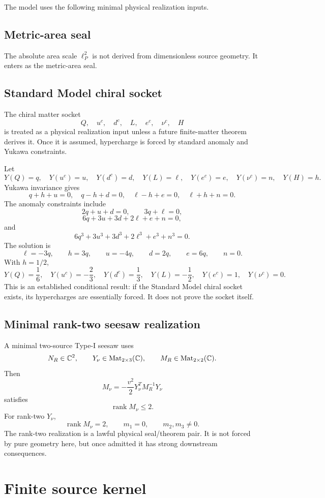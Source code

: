 \documentclass[11pt]{article}
\newcommand{\rank}{\operatorname{rank}}
\begin{document}
The model uses the following minimal physical realization inputs.

\subsection{Metric-area seal}

The absolute area scale \(\ell_P^2\) is not derived from dimensionless source geometry. It enters as the metric-area seal.

\subsection{Standard Model chiral socket}

The chiral matter socket
\[
Q,\quad u^c,\quad d^c,\quad L,\quad e^c,\quad \nu^c,\quad H
\]
is treated as a physical realization input unless a future finite-matter theorem derives it. Once it is assumed, hypercharge is forced by standard anomaly and Yukawa constraints.

Let
\[
Y(Q)=q,\quad Y(u^c)=u,\quad Y(d^c)=d,\quad
Y(L)=\ell,\quad Y(e^c)=e,\quad Y(\nu^c)=n,\quad Y(H)=h.
\]
Yukawa invariance gives
\[
q+h+u=0,\quad q-h+d=0,\quad \ell-h+e=0,\quad \ell+h+n=0.
\]
The anomaly constraints include
\[
2q+u+d=0,\qquad 3q+\ell=0,
\]
\[
6q+3u+3d+2\ell+e+n=0,
\]
and
\[
6q^3+3u^3+3d^3+2\ell^3+e^3+n^3=0.
\]
The solution is
\[
\ell=-3q,\qquad h=3q,\qquad u=-4q,\qquad d=2q,\qquad e=6q,\qquad n=0.
\]
With \(h=1/2\),
\[
Y(Q)=\frac16,\quad
Y(u^c)=-\frac23,\quad
Y(d^c)=\frac13,\quad
Y(L)=-\frac12,\quad
Y(e^c)=1,\quad
Y(\nu^c)=0.
\]
This is an established conditional result: if the Standard Model chiral socket exists, its hypercharges are essentially forced. It does not prove the socket itself.

\subsection{Minimal rank-two seesaw realization}

A minimal two-source Type-I seesaw uses
\[
N_R\in\mathbb C^2,\qquad
Y_\nu\in{\rm Mat}_{2\times3}(\mathbb C),\qquad
M_R\in{\rm Mat}_{2\times2}(\mathbb C).
\]
Then
\[
M_\nu=-\frac{v^2}{2}Y_\nu^T M_R^{-1}Y_\nu
\]
satisfies
\[
\rank M_\nu\leq 2.
\]
For rank-two \(Y_\nu\),
\[
\rank M_\nu=2,\qquad m_1=0,\qquad m_2,m_3\neq0.
\]
The rank-two realization is a lawful physical seal/theorem pair. It is not forced by pure geometry here, but once admitted it has strong downstream consequences.

\section{Finite source kernel}
\end{document}
